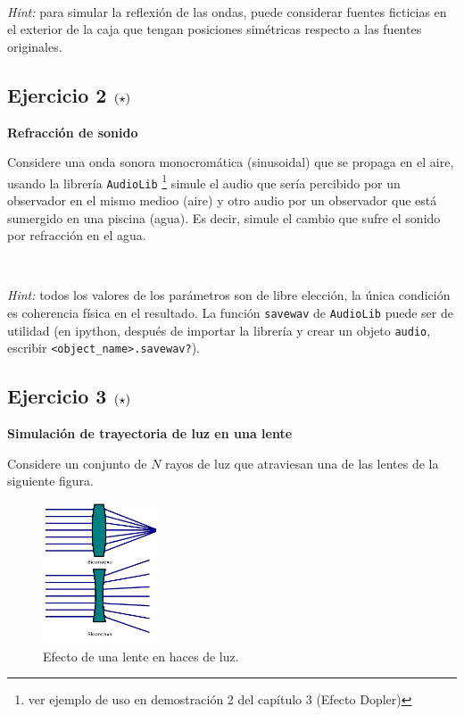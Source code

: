 \

\textit{Hint:} para simular la reflexión de las ondas, puede considerar 
fuentes ficticias en el exterior de la caja que tengan posiciones simétricas
respecto a las fuentes originales.


\subsection*{Ejercicio 2 \large{$\left( \star \right)$}}

\textbf{Refracción de sonido}

Considere una onda sonora monocromática (sinusoidal) que se propaga en el 
aire, usando la librería \texttt{AudioLib} \footnote{ver ejemplo de uso en 
demostración 2 del capítulo 3 (Efecto Dopler)} simule el audio que sería 
percibido por un observador en el mismo medioo (aire) y otro audio por un
observador que está sumergido en una piscina (agua). Es decir, simule el 
cambio que sufre el sonido por refracción en el agua.

\

\textit{Hint:} todos los valores de los parámetros son de libre elección,
la única condición es coherencia física en el resultado. La función 
\texttt{savewav} de \texttt{AudioLib} puede ser de utilidad (en ipython,
después de importar la librería y crear un objeto \texttt{audio}, 
escribir \texttt{<object\_name>.savewav?}).

\newpage
\subsection*{Ejercicio 3 \large{$\left( \star \right)$}}

\textbf{Simulación de trayectoria de luz en una lente}

Considere un conjunto de $N$ rayos de luz que atraviesan una de las lentes
de la siguiente figura.

\begin{figure}[htbp]
	\centering
	\includegraphics[width=0.30\textwidth]
	{./pictures/lens.png}

	\caption{\small{Efecto de una lente en haces de luz.}}
	
	\label{fig:lens}
\end{figure}

